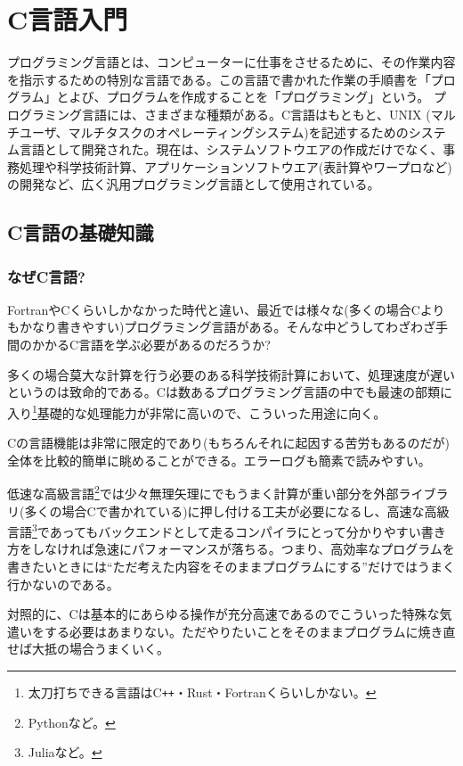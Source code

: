 \chapter{C言語入門}

\noindent
プログラミング言語とは、コンピューターに仕事をさせるために、その作業内容を指示するための特別な言語である。この言語で書かれた作業の手順書を「プログラム」とよび、プログラムを作成することを「プログラミング」という。
プログラミング言語には、さまざまな種類がある。C言語はもともと、UNIX (マルチユーザ、マルチタスクのオペレーティングシステム)を記述するためのシステム言語として開発された。現在は、システムソフトウエアの作成だけでなく、事務処理や科学技術計算、アプリケーションソフトウエア(表計算やワープロなど)の開発など、広く汎用プログラミング言語として使用されている。

\section{C言語の基礎知識}
\label{sec:C:basic}
\subsection{なぜC言語?}

FortranやCくらいしかなかった時代と違い、最近では様々な(多くの場合Cよりもかなり書きやすい)プログラミング言語がある。そんな中どうしてわざわざ手間のかかるC言語を学ぶ必要があるのだろうか?

多くの場合莫大な計算を行う必要のある科学技術計算において、処理速度が遅いというのは致命的である。Cは数あるプログラミング言語の中でも最速の部類に入り\footnote{太刀打ちできる言語はC\texttt{++}・Rust・Fortranくらいしかない。}基礎的な処理能力が非常に高いので、こういった用途に向く。

Cの言語機能は非常に限定的であり(もちろんそれに起因する苦労もあるのだが)全体を比較的簡単に眺めることができる。エラーログも簡素で読みやすい。

低速な高級言語\footnote{Pythonなど。}では少々無理矢理にでもうまく計算が重い部分を外部ライブラリ(多くの場合Cで書かれている)に押し付ける工夫が必要になるし、高速な高級言語\footnote{Juliaなど。}であってもバックエンドとして走るコンパイラにとって分かりやすい書き方をしなければ急速にパフォーマンスが落ちる。つまり、高効率なプログラムを書きたいときには``ただ考えた内容をそのままプログラムにする''だけではうまく行かないのである。

対照的に、Cは基本的にあらゆる操作が充分高速であるのでこういった特殊な気遣いをする必要はあまりない。ただやりたいことをそのままプログラムに焼き直せば大抵の場合うまくいく。


